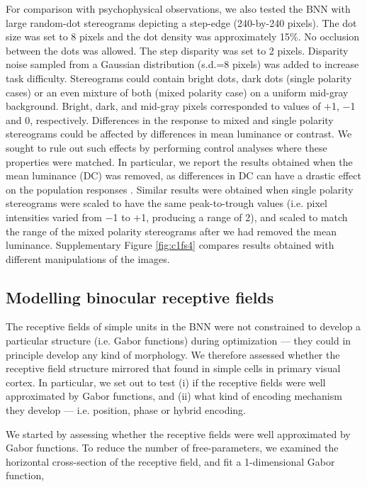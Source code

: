 For comparison with psychophysical observations, we also tested the BNN with large random-dot stereograms depicting a step-edge (240-by-240 pixels). The dot size was set to 8 pixels and the dot density was approximately 15\%. No occlusion between the dots was allowed. The step disparity was set to 2 pixels. Disparity noise sampled from a Gaussian distribution (s.d.=8 pixels) was added to increase task difficulty. Stereograms could contain bright dots, dark dots (single polarity cases) or an even mixture of both (mixed polarity case) on a uniform mid-gray background. Bright, dark, and mid-gray pixels corresponded to values of $+$1, $-$1 and 0, respectively. Differences in the response to mixed and single polarity stereograms could be affected by differences in mean luminance or contrast. We sought to rule out such effects by performing control analyses where these properties were matched. In particular, we report the results obtained when the mean luminance (DC) was removed, as differences in DC can have a drastic effect on the population responses \cite{Read:2011im}. Similar results were obtained when single polarity stereograms were scaled to have the same peak-to-trough values (i.e. pixel intensities varied from $-$1 to $+$1, producing a range of 2), and scaled to match the range of the mixed polarity stereograms after we had removed the mean luminance. Supplementary Figure \ref{fig:c1fs4} compares results obtained with different manipulations of the images.

\subsection*{Modelling binocular receptive fields}

The receptive fields of simple units in the BNN were not constrained to develop a particular structure (i.e. Gabor functions) during optimization --- they could in principle develop any kind of morphology. We therefore assessed whether the receptive field structure mirrored that found in simple cells in primary visual cortex. In particular, we set out to test (i) if the receptive fields were well approximated by Gabor functions, and (ii) what kind of encoding mechanism they develop --- i.e. position, phase or hybrid encoding. 

We started by assessing whether the receptive fields were well approximated by Gabor functions. To reduce the number of free-parameters, we examined the horizontal cross-section of the receptive field, and fit a 1-dimensional Gabor function,

